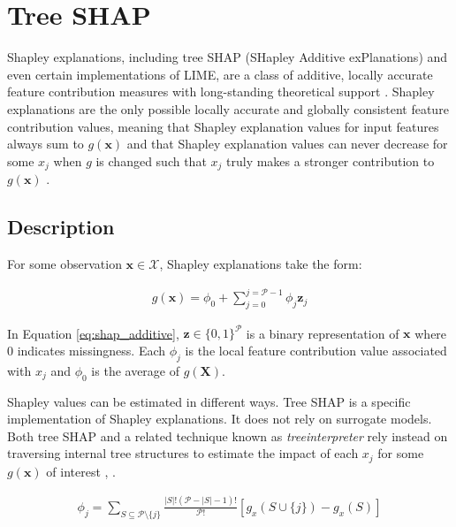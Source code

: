 \documentclass[sigconf]{acmart}
\begin{document}
\section{Tree SHAP} \label{sec:shap}

Shapley explanations, including tree SHAP (SHapley Additive exPlanations) and even certain implementations of LIME, are a class of additive, locally accurate feature contribution measures with long-standing theoretical support \cite{shapley}. Shapley explanations are the only possible locally accurate and globally consistent feature contribution values, meaning that Shapley explanation values for input features always sum to $g(\mathbf{x})$ and that Shapley explanation values can never decrease for some $x_j$ when $g$ is changed such that $x_j$ truly makes a stronger contribution to $g(\mathbf{x})$ \cite{shapley}. 

\subsection{Description}

For some observation $\mathbf{x} \in \mathcal{X}$, Shapley explanations take the form:

\begin{equation}
\label{eq:shap_additive}
\begin{aligned}
g(\mathbf{x}) = \phi_0 + \sum_{j=0}^{j=\mathcal{P} - 1} \phi_j \mathbf{z}_j
\end{aligned}
\end{equation}

\noindent In Equation \ref{eq:shap_additive}, $\mathbf{z} \in \{0,1\}^\mathcal{P}$ is a binary representation of $\mathbf{x}$ where 0 indicates missingness. Each $\phi_j$ is the local feature contribution value associated with $x_j$ and $\phi_0$ is the average of $g(\mathbf{X})$. 

Shapley values can be estimated in different ways. Tree SHAP is a specific implementation of Shapley explanations. It does not rely on surrogate models. Both tree SHAP and a related technique known as \textit{treeinterpreter} rely instead on traversing internal tree structures to estimate the impact of each $x_j$ for some $g(\mathbf{x})$ of interest \cite{tree_shap}, \cite{treeinterpreter}.

\begin{equation}
\label{eq:shap_contrib}
\begin{aligned}
\phi_{j} = \sum_{S \subseteq \mathcal{P} \setminus \{j\}}\frac{|S|!(\mathcal{P} -|S| -1)!}{\mathcal{P}!}[g_x(S \cup \{j\}) - g_x(S)]
\end{aligned}
\end{equation}
\end{document}
